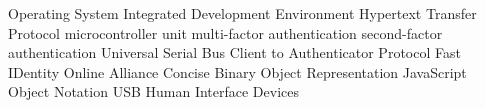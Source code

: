       {Operating System}
     {Integrated Development Environment}
    {Hypertext Transfer Protocol}
     {microcontroller unit}
     {multi-factor authentication}
     {second-factor authentication}
     {Universal Serial Bus}
    {Client to Authenticator Protocol}
    {Fast IDentity Online Alliance}
    {Concise Binary Object Representation}
    {JavaScript Object Notation}
     {USB Human Interface Devices}
